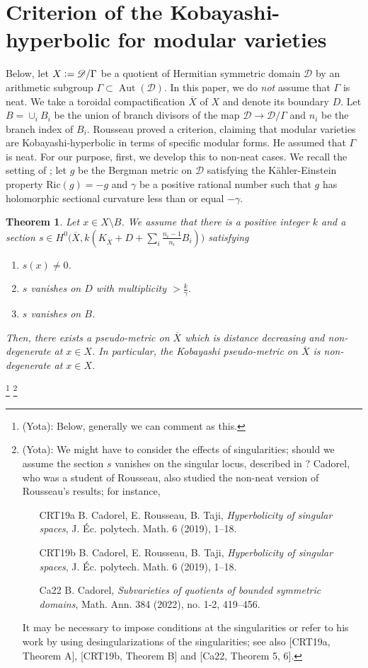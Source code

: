 \documentclass[12pt, pdftex]{amsart}
\theoremstyle{plain}
\newtheorem{thm}{Theorem}[section]
\theoremstyle{definition}
\numberwithin{equation}{section}
\def\Aut{\mathop{\mathrm{Aut}}\nolimits}
\def\D{\mathscr{D}}
\newcommand{\defeq}{\vcentcolon=}
\newcommand{\marg}[1]{\normalsize{{\color{red}\footnote{#1}}}{\marginpar[\vskip -.3cm {\color{red}\hfill\tiny{\thefootnote}\normalsize$\implies$}]{\vskip -.3cm{ \color{red}$\impliedby$\tiny\thefootnote}}}}
\newcommand{\Yota}[1]{\marg{\color{blue}(Yota): #1}}
\begin{document}
\section{Criterion of the Kobayashi-hyperbolic for modular varieties}
Below, let $X\defeq\D/\Gamma$ be a quotient of Hermitian symmetric domain $\D$ by an arithmetic subgroup $\Gamma\subset\Aut(\D)$.
In this paper, we do \textit{not} assume that $\Gamma$ is neat.
We take a toroidal compactification $\overline{X}$ of $X$ and denote its boundary $D$.
Let $B=\cup_i B_i$ be the union of branch divisors of the map $\D\to\D/\Gamma$ and $n_i$ be the branch index of $B_i$.
Rousseau \cite[Theorem 2.1]{Ro16} proved a criterion, claiming that modular varieties are Kobayashi-hyperbolic in terms of specific modular forms.
He assumed that $\Gamma$ is neat.
For our purpose, first, we develop this to non-neat cases.
We recall the setting of \cite{Ro16}; let $g$ be the Bergman metric on $\D$ satisfying the K\"ahler-Einstein property $\mathrm{Ric}(g)=-g$ and $\gamma$ be a positive rational number such that $g$ has holomorphic sectional curvature less than or equal $-\gamma$.
\begin{thm}
\label{thm:hyperbolicity}
Let $x\in X\setminus B$.
We assume that there is a positive integer $k$ and a section $s\in H^0\bigl(\overline{X}, k(K_{\overline{X}}+D+\sum_i \frac{n_i-1}{n_i}B_i)\bigr)$ satisfying 
\begin{enumerate}
\item $s(x)\neq 0$.
\item $s$ vanishes on $D$ with multiplicity $>\frac{k}{\gamma}$.
\item $s$ vanishes on $B$.
\end{enumerate}
Then, there exists a pseudo-metric on $\overline{X}$ which is distance decreasing and  non-degenerate at $x\in X$.
In particular, the Kobayashi pseudo-metric on $\overline{X}$ is non-degenerate at $x\in X$.
\end{thm}
\Yota{Below, generally we can comment as this.}
\Yota{We might have to consider the effects of singularities; should we assume the section $s$ vanishes on the singular locus, described in \cite[Section 4]{HS94}?
Cadorel, who was a student of Rousseau, also studied the non-neat version of Rousseau's results; for instance, 
\begin{itemize}
\item [CRT19a] B. Cadorel, E. Rousseau, B. Taji,
\textit{Hyperbolicity of singular spaces},
J. Éc. polytech. Math. 6 (2019), 1–18.
\item [CRT19b] B. Cadorel,  E. Rousseau,  B. Taji,
\textit{Hyperbolicity of singular spaces},
J. Éc. polytech. Math. 6 (2019), 1–18.
    \item [Ca22] B. Cadorel, \textit{Subvarieties of quotients of bounded symmetric domains}, 
Math. Ann. 384 (2022), no. 1-2, 419–456.
\end{itemize}
It may be necessary to impose conditions at the singularities or refer to his work by using desingularizations of the singularities; see also [CRT19a, Theorem A], [CRT19b, Theorem B] and [Ca22, Theorem 5, 6].}
\end{document}
